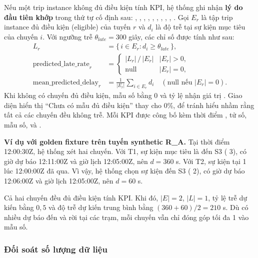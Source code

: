 Nếu một trip instance không đủ điều kiện tính KPI, hệ thống ghi nhận \textbf{lý do đầu tiên khớp} trong thứ tự cố định sau: , , , , , , , , , . Gọi $E_r$ là tập trip instance đủ điều kiện (eligible) của tuyến $r$ và $d_i$ là độ trễ tại sự kiện mục tiêu của chuyến $i$. Với ngưỡng trễ $\theta_{late} = 300$ giây, các chỉ số được tính như sau:
\begin{align}
L_r &= \{\, i \in E_r : d_i \ge \theta_{late} \,\}, \\
\text{predicted\_late\_rate}_r &=
\begin{cases}
|L_r| \,/\, |E_r| & |E_r| > 0,\\
\text{null} & |E_r| = 0,
\end{cases} \\
\text{mean\_predicted\_delay}_r &= \frac{1}{|E_r|}\sum_{i \in E_r} d_i \quad (\text{null nếu } |E_r| = 0).
\end{align}
Khi không có chuyến đủ điều kiện, mẫu số bằng 0 và tỷ lệ nhận giá trị . Giao diện hiển thị ``Chưa có mẫu đủ điều kiện'' thay cho 0\%, để tránh hiểu nhầm rằng tất cả các chuyến đều không trễ. Mỗi KPI được công bố kèm thời điểm , tử số, mẫu số,  và .

\textbf{Ví dụ với golden fixture trên tuyến synthetic R\_A.} Tại thời điểm 12:00:30Z, hệ thống xét hai chuyến. Với T1, sự kiện mục tiêu là đến S3 ( 3), có giờ dự báo 12:11:00Z và giờ lịch 12:05:00Z, nên $d = 360$ s. Với T2, sự kiện tại  1 lúc 12:00:00Z đã qua. Vì vậy, hệ thống chọn sự kiện đến S3 ( 2), có giờ dự báo 12:06:00Z và giờ lịch 12:05:00Z, nên $d = 60$ s.

Cả hai chuyến đều đủ điều kiện tính KPI. Khi đó, $|E| = 2$, $|L| = 1$, tỷ lệ trễ dự kiến bằng $0{,}5$ và độ trễ dự kiến trung bình bằng $(360+60)/2 = 210$ s. Dù có nhiều dự báo đến và rời tại các trạm, mỗi chuyến vẫn chỉ đóng góp tối đa 1 vào mẫu số.

\subsubsection{Đối soát số lượng dữ liệu}


